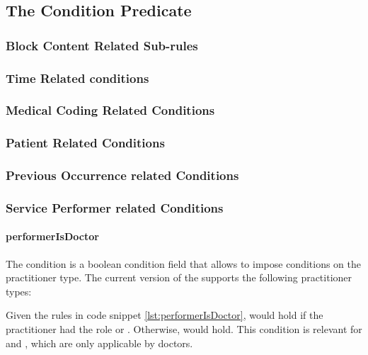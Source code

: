 \subsection{The Condition Predicate}\label{subsec:the-condition-predicate}

\subsubsection{Block Content Related Sub-rules}

\subsubsection{Time Related conditions}

\subsubsection{Medical Coding Related Conditions}

\subsubsection{Patient Related Conditions}

\subsubsection{Previous Occurrence related Conditions}

\subsubsection{Service Performer related Conditions}

\paragraph{performerIsDoctor}
The  condition is a boolean condition field that allows to impose conditions on the practitioner type.
The current version of the \AVS supports the following practitioner types:




Given the rules in code snippet \ref{lst:performerIsDoctor},  would hold if the practitioner had the role 
or .
Otherwise,  would hold.
This condition is relevant for  and , which are only applicable by doctors.



